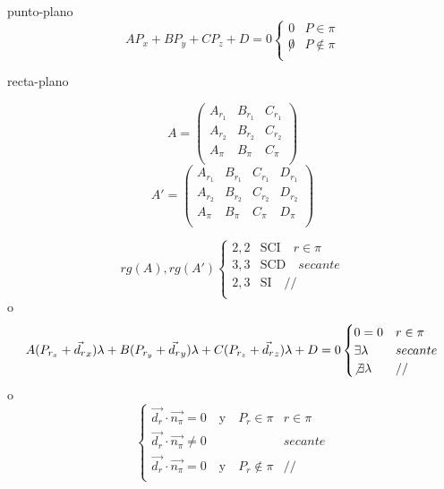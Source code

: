 \documentclass[12pt, letterpaper, twoside]{article}
\begin{document}
	punto-plano
	\begin{equation}
		A P_x + B P_y + C P_z + D = 0
		\begin{cases}
			0     & P \in \pi     \\
			\not0 & P \not\in \pi \\
		\end{cases}
	\end{equation}

	recta-plano
	\begin{multicols}{2}
		\noindent
		\begin{equation}
			A =
			\begin{pmatrix}
				A_{r_1} & B_{r_1} & C_{r_1} \\
				A_{r_2} & B_{r_2} & C_{r_2} \\
				A_\pi   & B_\pi   & C_\pi   \\
			\end{pmatrix}
		\end{equation}
		\begin{equation}
			A' =
			\begin{pmatrix}
				A_{r_1} & B_{r_1} & C_{r_1} & D_{r_1} \\
				A_{r_2} & B_{r_2} & C_{r_2} & D_{r_2} \\
				A_\pi   & B_\pi   & C_\pi   & D_\pi   \\
			\end{pmatrix}
		\end{equation}
	\end{multicols}
	\begin{equation}
		rg(A), rg(A')
		\begin{cases}
			2, 2 & \text{SCI} \quad r  \in \pi  \\
			3, 3 & \text{SCD} \quad secante     \\
			2, 3 & \text{SI}  \quad //          \\
		\end{cases}
	\end{equation}
	o
	\begin{equation}
		A (P_{r_x} + \vec{d_r}_x) \lambda + B (P_{r_y} + \vec{d_r}_y) \lambda + C (P_{r_z} + \vec{d_r}_z) \lambda + D = 0
		\begin{cases}
			0=0                 & r \in \pi   \\
			\exists\lambda      & secante     \\
			\not\exists\lambda  & //          \\
		\end{cases}
	\end{equation}
	o
	\begin{equation}
		\begin{cases}
			\vec{d_r} \cdot \vec{n_\pi} = 0 \quad \text{y} \quad P_r \in \pi       & r \in \pi   \\
			\vec{d_r} \cdot \vec{n_\pi} \not= 0                 & secante     \\
			\vec{d_r} \cdot \vec{n_\pi} = 0 \quad \text{y} \quad P_r \not\in \pi   & //          \\
		\end{cases}
	\end{equation}
	
\end{document}
